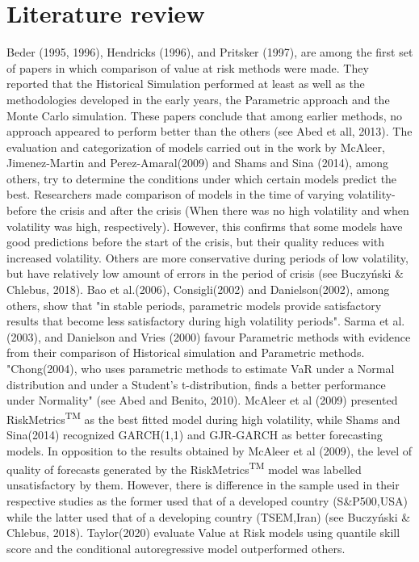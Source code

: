 \documentclass[a4paper,11pt,oneside]{book}
\begin{document}



\section{Literature review}

Beder (1995, 1996), Hendricks (1996), and
Pritsker (1997), are among the first set of papers in which comparison of value at risk methods were made. They reported that the Historical Simulation performed at least as well as the methodologies developed in the early years, the Parametric approach and the Monte Carlo simulation. These papers conclude that among earlier methods, no approach appeared to perform better than the
others (see Abed et all, 2013). The evaluation and categorization of models carried out in the work by McAleer, Jimenez-Martin and Perez-Amaral(2009) and Shams and Sina (2014), among others, try to determine the conditions under which certain models predict the best. Researchers made comparison of models in the time of varying volatility-before the crisis and after the crisis (When there was no high volatility and when volatility was high, respectively). However, this confirms that some models have good predictions before the start of the crisis, but their quality reduces with increased volatility. Others are more conservative during periods of low volatility, but have relatively low amount of errors in the period of crisis (see Buczyński \& Chlebus, 2018).
\newline\newline
Bao et al.(2006), Consigli(2002) and Danielson(2002), among
others, show that "in stable periods, parametric models provide satisfactory results
that become less satisfactory during high volatility periods". Sarma et al. (2003), and Danielson and Vries (2000) favour Parametric methods with evidence from their comparison of Historical simulation and Parametric methods. "Chong(2004),
who uses parametric methods to estimate VaR under a Normal distribution and under a
Student’s t-distribution, finds a better performance under Normality" (see Abed and Benito, 2010). McAleer et al (2009) presented RiskMetrics\textsuperscript{TM} as
the best fitted model during high volatility, while Shams and Sina(2014) recognized GARCH(1,1) and GJR-GARCH as better
forecasting models. In opposition to the results obtained
by McAleer et al (2009), the level of quality of forecasts
generated by the RiskMetrics\textsuperscript{TM} model was labelled
unsatisfactory by them. However, there is difference in the sample used in their respective studies as the former used that of a developed country (S\&P500,USA) while the latter used that of a developing  country (TSEM,Iran) (see Buczyński \& Chlebus, 2018). Taylor(2020) evaluate Value at Risk models using quantile skill score and the conditional autoregressive model outperformed others.
\newline\newline
\end{document}
